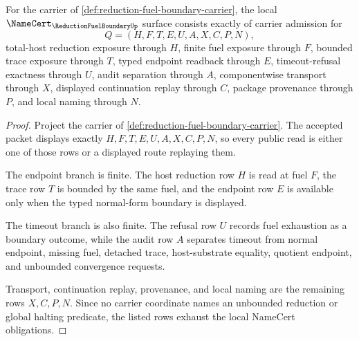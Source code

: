 \begin{theorem}
\label{thm:reduction-fuel-boundary-namecert-obligations}
For the carrier of \autoref{def:reduction-fuel-boundary-carrier}, the local $\NameCert_{\ReductionFuelBoundaryUp}$ surface consists exactly of carrier admission for
$$
Q=(H,F,T,E,U,A,X,C,P,N),
$$
total-host reduction exposure through $H$, finite fuel exposure through $F$, bounded trace exposure through $T$, typed endpoint readback through $E$, timeout-refusal exactness through $U$, audit separation through $A$, componentwise transport through $X$, displayed continuation replay through $C$, package provenance through $P$, and local naming through $N$.
\end{theorem}
\begin{proof}
Project the carrier of \autoref{def:reduction-fuel-boundary-carrier}. The accepted packet displays exactly $H,F,T,E,U,A,X,C,P,N$, so every public read is either one of those rows or a displayed route replaying them.

The endpoint branch is finite. The host reduction row $H$ is read at fuel $F$, the trace row $T$ is bounded by the same fuel, and the endpoint row $E$ is available only when the typed normal-form boundary is displayed.

The timeout branch is also finite. The refusal row $U$ records fuel exhaustion as a boundary outcome, while the audit row $A$ separates timeout from normal endpoint, missing fuel, detached trace, host-substrate equality, quotient endpoint, and unbounded convergence requests.

Transport, continuation replay, provenance, and local naming are the remaining rows $X,C,P,N$. Since no carrier coordinate names an unbounded reduction or global halting predicate, the listed rows exhaust the local NameCert obligations.
\end{proof}

